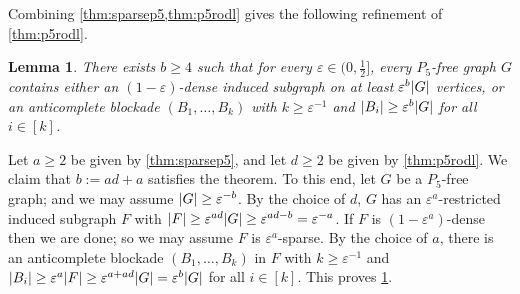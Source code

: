 \documentclass[11pt,reqno]{amsart}
\newtheorem{lemma}[theorem]{Lemma}
\let\oldendproof\endproof
\renewenvironment{proof}[1][\proofname]{%
	\oldproof[\normalfont\bfseries #1]%
}{\oldendproof}
\newcommand{\eps}{\varepsilon}
\DeclarePairedDelimiter\abs{\lvert}{\rvert}%
\begin{document}
	Combining \cref{thm:sparsep5,thm:p5rodl} gives the following refinement of \cref{thm:p5rodl}.
	\begin{lemma}
		\label{thm:p5antirodl}
		There exists $b\ge4$ such that for every $\eps\in(0,\frac12]$, every $P_5$-free graph $G$ contains either an $(1-\eps)$-dense induced subgraph on at least $\eps^b\abs G$ vertices,
		or an anticomplete blockade $(B_1,\ldots,B_k)$ with $k\ge\eps^{-1}$ and $\abs{B_i}\ge\eps^b\abs G$ for all $i\in[k]$.
	\end{lemma}
	\begin{proof}
		Let $a\ge2$ be given by \cref{thm:sparsep5}, and let $d\ge2$ be given by \cref{thm:p5rodl}.
		We claim that $b:=ad+a$ satisfies the theorem.
		To this end, let $G$ be a $P_5$-free graph;
		and we may assume $\abs G\ge\eps^{-b}$.
		By the choice of $d$, $G$ has an $\eps^a$-restricted induced subgraph $F$ with $\abs F\ge \eps^{ad}\abs G\ge\eps^{ad-b}=\eps^{-a}$.
		If $F$ is $(1-\eps^a)$-dense then we are done;
		so we may assume $F$ is $\eps^a$-sparse.
		By the choice of $a$,
		there is an anticomplete blockade $(B_1,\ldots,B_k)$ in $F$ with $k\ge\eps^{-1}$ and $\abs{B_i}\ge\eps^a\abs F\ge \eps^{a+ad}\abs G=\eps^b\abs G$ for all $i\in[k]$.
		This proves \cref{thm:p5antirodl}.
	\end{proof}
	
\end{document}
